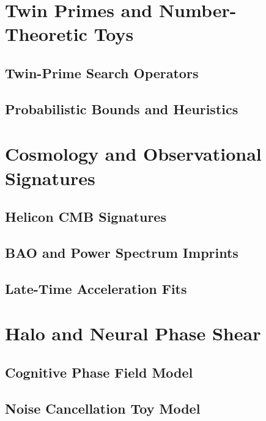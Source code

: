 \section{Twin Primes and Number-Theoretic Toys}
\label{app:primes}

\subsection{Twin-Prime Search Operators}

\subsection{Probabilistic Bounds and Heuristics}

\section{Cosmology and Observational Signatures}
\label{app:cosmology}

\subsection{Helicon CMB Signatures}

\subsection{BAO and Power Spectrum Imprints}

\subsection{Late-Time Acceleration Fits}

\section{Halo and Neural Phase Shear}
\label{app:halo}

\subsection{Cognitive Phase Field Model}

\subsection{Noise Cancellation Toy Model}

